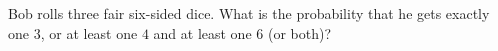 Bob rolls three fair six-sided dice. What is the probability that he gets exactly one $3$, or at least one $4$ and at least one $6$ (or both)?
